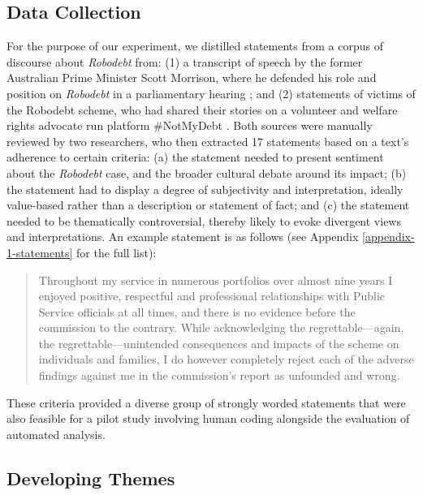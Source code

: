 \documentclass{article}
\begin{document}
\subsection{Data Collection}\label{data-collection}

For the purpose of our experiment, we distilled statements from a corpus of discourse about \emph{Robodebt} from: (1) a transcript of speech by the former Australian Prime Minister Scott Morrison, where he defended his role and position on \emph{Robodebt} in a parliamentary hearing \cite{commonwealthParliamentaryDebatesHansrad2023}; and (2) statements of victims of the Robodebt scheme, who had shared their stories on a volunteer and welfare rights advocate run platform \#NotMyDebt \cite{notmydebtNotMyDebt2018}. Both sources were manually reviewed by two researchers, who then extracted 17 statements based on a text's adherence to certain criteria: (a) the statement needed to present sentiment about the \emph{Robodebt} case, and the broader cultural debate around its impact; (b) the statement had to display a degree of subjectivity and interpretation, ideally value-based rather than a description or statement of fact; and (c) the statement needed to be thematically controversial, thereby likely to evoke divergent views and interpretations. An example statement is as follows (see Appendix \ref{appendix-1-statements} for the full list):

\begin{quote}
Throughout my service in numerous portfolios over almost nine years I enjoyed positive, respectful and professional relationships with Public Service officials at all times, and there is no evidence before the commission to the contrary. While acknowledging the regrettable—again, the regrettable—unintended consequences and impacts of the scheme on individuals and families, I do however completely reject each of the adverse findings against me in the commission's report as unfounded and wrong. \cite[para. 15]{commonwealthParliamentaryDebatesHansrad2023} 
\end{quote}

These criteria provided a diverse group of strongly worded statements that were also feasible for a pilot study involving human coding alongside the evaluation of automated analysis.


\subsection{Developing Themes}\label{developing-themes}
\end{document}
